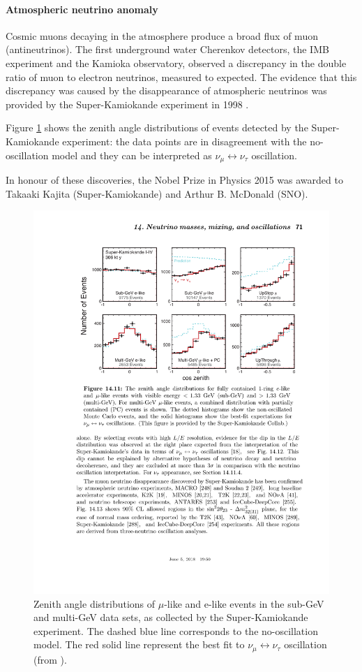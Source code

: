 \paragraph{Atmospheric neutrino anomaly}
Cosmic muons decaying in the atmosphere produce a broad flux of muon (antineutrinos). The first underground water Cherenkov detectors, the IMB experiment and the Kamioka observatory, observed a discrepancy in the double ratio of muon to electron neutrinos, measured to expected. The evidence that this discrepancy was caused by the disappearance of atmospheric neutrinos was provided by the Super-Kamiokande experiment in 1998 \cite{Fukuda:1998mi}.

Figure \ref{fig:superk} shows the zenith angle distributions of events detected by the Super-Kamiokande experiment: the data points are in disagreement with the no-oscillation model and they can be interpreted as $\nu_{\mu} \leftrightarrow \nu_{\tau}$ oscillation.

In honour of these discoveries, the Nobel Prize in Physics 2015 was awarded to Takaaki Kajita (Super-Kamiokande) and Arthur B. McDonald (SNO). 

\begin{figure}[htbp]
    \centering
    \includegraphics[width=0.9\linewidth]{figures/superk.pdf}
    \caption{Zenith angle distributions of $\mu$-like and e-like events in the sub-GeV and multi-GeV data sets, as collected by the Super-Kamiokande experiment. The dashed blue line corresponds to the no-oscillation model. The red solid line represent the best fit to $\nu_{\mu} \leftrightarrow \nu_{\tau}$ oscillation (from \cite{PhysRevD.98.030001}).}
    \label{fig:superk}
\end{figure}


